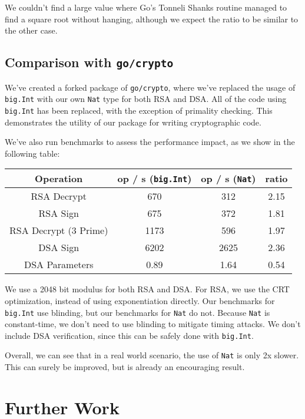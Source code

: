 \documentclass[11pt, a4paper]{article} %
\begin{document}
{We couldn't find a large value where Go's Tonneli Shanks routine
managed to find a square root without hanging, although we
expect the ratio to be similar to the other case.

\subsection{Comparison with \texttt{go/crypto}}

We've created a forked package
\cite{meier_cronokirbyctcrypto_2021}
of \texttt{go/crypto}, where we've replaced the usage of \texttt{big.Int}
with our own \texttt{Nat} type for both RSA and DSA. All of the code
using \texttt{big.Int} has been replaced, with the exception of
primality checking. This demonstrates the utility of
our package for writing cryptographic code.

We've also run benchmarks to assess the performance impact, as we
show in the following table:

\begin{center}
 \begin{tabular}{|c | c | c | c|} 
 \hline
 Operation & op / s (\texttt{big.Int}) & op / s (\texttt{Nat}) & ratio \\ [0.5ex] 
 \hline\hline
 RSA Decrypt & 670 & 312 & 2.15 \\
 \hline
 RSA Sign & 675 & 372 & 1.81 \\
 \hline
 RSA Decrypt (3 Prime) & 1173 & 596 & 1.97 \\
 \hline
 DSA Sign & 6202 & 2625 & 2.36 \\
 \hline
 DSA Parameters & 0.89 & 1.64 & 0.54 \\
 \hline
\end{tabular}
\end{center}

We use a 2048 bit modulus for both RSA and DSA. For RSA, we use
the CRT optimization, instead of using exponentiation directly.
Our benchmarks for \texttt{big.Int} use blinding, but our benchmarks
for \texttt{Nat} do not. Because \texttt{Nat} is constant-time,
we don't need to use blinding to mitigate timing attacks.
We don't include DSA verification, since this can be safely done
with \texttt{big.Int}.

Overall, we can see that in a real world scenario, the use
of \texttt{Nat} is only 2x slower. This can surely be improved,
but is already an encouraging result.

\section{Further Work}

}
\end{document}
